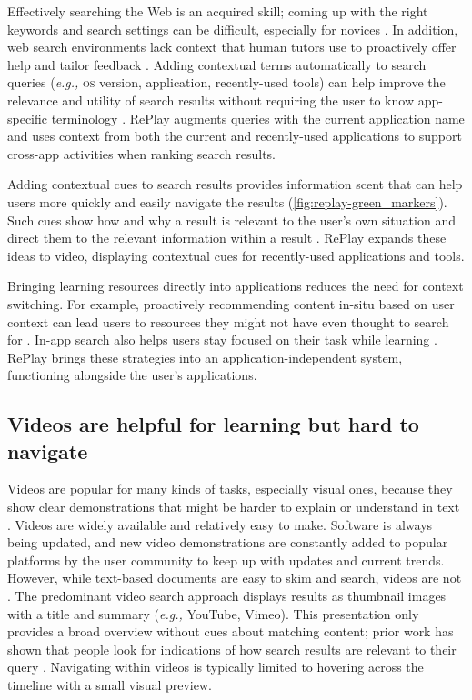 Effectively searching the Web is an acquired skill; coming up with the right keywords and search settings can be difficult, especially for novices \cite{Russell2011}. In addition, web search environments lack context that human tutors use to proactively offer help and tailor feedback \cite{Schon1983}. Adding contextual terms automatically to search queries (\textit{e.g.,} \textsc{os} version, application, recently-used tools) can help improve the relevance and utility of search results without requiring the user to know app-specific terminology \cite{Ekstrand2011, Brandt2010, Matejka2011a}. RePlay augments queries with the current application name and uses context from both the current and recently-used applications to support cross-app activities when ranking search results.

Adding contextual cues to search results provides information scent that can help users more quickly and easily navigate the results (\autoref{fig:replay-green_markers}). Such cues show how and why a result is relevant to the user's own situation and direct them to the relevant information within a result \cite{Ekstrand2011, Fourney2014Intertwine}. RePlay expands these ideas to video, displaying contextual cues for recently-used applications and tools.

Bringing learning resources directly into applications reduces the need for context switching. For example, proactively recommending content in-situ based on user context can lead users to resources they might not have even thought to search for \cite{Matejka2009, Fraser2016, Chilana2012, Matejka2011, Ichinco2017}. In-app search also helps users stay focused on their task while learning \cite{Lafreniere2014a, Fraser2016, Chilana2012}. RePlay brings these strategies into an application-independent system, functioning alongside the user's applications.

\subsection{Videos are helpful for learning but hard to navigate}
Videos are popular for many kinds of tasks, especially visual ones, because they show clear demonstrations that might be harder to explain or understand in text \cite{Chi2012, Pongnumkul2011}. Videos are widely available and relatively easy to make. Software is always being updated, and new video demonstrations are constantly added to popular platforms by the user community to keep up with updates and current trends. However, while text-based documents are easy to skim and search, videos are not \cite{Pavel2014, Pavel2015, Kim2014}. The predominant video search approach displays results as thumbnail images with a title and summary (\textit{e.g.,} YouTube, Vimeo). This presentation only provides a broad overview without cues about matching content; prior work has shown that people look for indications of how search results are relevant to their query \cite{Hearst2009Book}. Navigating within videos is typically limited to hovering across the timeline with a small visual preview.

